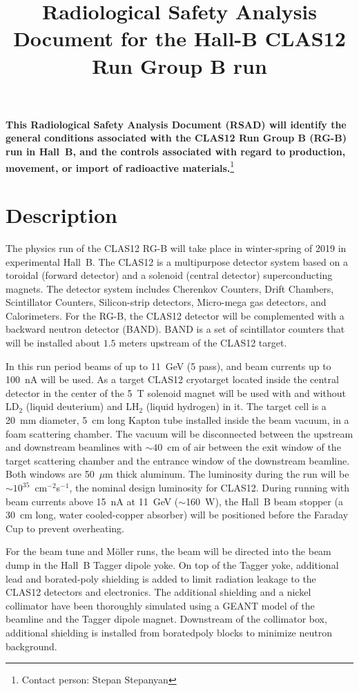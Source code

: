 \documentclass [12pt]{article}
\title{Radiological Safety Analysis Document for the Hall-B CLAS12 Run Group B run}
\begin{document}
\date{}
\vskip 0.5cm
\maketitle

\noindent

{\bf This Radiological Safety Analysis Document (RSAD) will identify the
general conditions associated with the CLAS12 
Run Group B (RG-B) run in Hall~B, and the controls associated with regard to production, 
movement, or import of radioactive materials.}\footnote{Contact person: Stepan Stepanyan}

\section{Description}
\indent

The physics run of the CLAS12 RG-B will take place in winter-spring of 2019 in experimental 
Hall~B. The CLAS12 is a multipurpose detector system based on a toroidal (forward detector) 
and a solenoid (central detector) superconducting magnets. The detector system includes Cherenkov Counters, 
Drift Chambers, Scintillator Counters, Silicon-strip detectors, Micro-mega gas detectors, 
and Calorimeters. For the RG-B, the CLAS12 detector will be complemented with a backward neutron detector (BAND). BAND is a set of scintillator counters that will be installed about $1.5$ meters upstream of the CLAS12 target. 

In this run period beams of up to 11~GeV 
(5 pass), and beam currents up to 100~nA will be used. As a target CLAS12 cryotarget  located inside 
the central detector in the center of the 5~T solenoid magnet will be used with and without LD$_2$ (liquid deuterium) and LH$_2$ (liquid hydrogen) in it. 
The target cell is a 20~mm diameter, 
5~cm long Kapton tube installed inside the beam vacuum, in a foam scattering chamber. The vacuum 
will be disconnected between the upstream and downstream beamlines with $\sim40$~cm of air between 
the exit window of the target scattering chamber and the entrance window of the downstream beamline. 
Both windows are 50~$\mu$m thick aluminum. The luminosity during the run will be 
$\sim 10^{35}$~cm$^{-2}$s$^{-1}$, the nominal design luminosity for CLAS12. During running with beam 
currents above 15~nA at 11~GeV ($\sim$160~W), the Hall~B beam stopper (a 30~cm long, water cooled-copper 
absorber) will be positioned before the Faraday Cup to prevent overheating. 

For the beam tune and M{\"o}ller runs, the beam will be directed into the beam dump in 
the Hall~B Tagger dipole yoke. On top of the Tagger yoke, additional lead and borated-poly shielding is added 
to limit radiation leakage to the CLAS12 detectors and electronics. The additional shielding 
and a nickel collimator have been thoroughly simulated using a GEANT model of the beamline and the 
Tagger dipole magnet. Downstream of the collimator box, additional shielding is installed from boratedpoly blocks to minimize neutron background.
\end{document}
